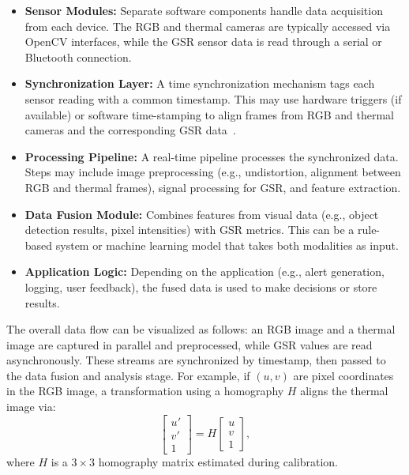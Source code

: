 \documentclass{article}
\begin{document}
    \begin{itemize}
        \item \textbf{Sensor Modules:} Separate software components handle data acquisition from each device. The RGB and thermal cameras are typically accessed via OpenCV interfaces, while the GSR sensor data is read through a serial or Bluetooth connection.
        \item \textbf{Synchronization Layer:} A time synchronization mechanism tags each sensor reading with a common timestamp. This may use hardware triggers (if available) or software time-stamping to align frames from RGB and thermal cameras and the corresponding GSR data~\cite{RefSync}.
        \item \textbf{Processing Pipeline:} A real-time pipeline processes the synchronized data. Steps may include image preprocessing (e.g., undistortion, alignment between RGB and thermal frames), signal processing for GSR, and feature extraction.
        \item \textbf{Data Fusion Module:} Combines features from visual data (e.g., object detection results, pixel intensities) with GSR metrics. This can be a rule-based system or machine learning model that takes both modalities as input.
        \item \textbf{Application Logic:} Depending on the application (e.g., alert generation, logging, user feedback), the fused data is used to make decisions or store results.
    \end{itemize}

    The overall data flow can be visualized as follows: an RGB image and a thermal image are captured in parallel and preprocessed, while GSR values are read asynchronously. These streams are synchronized by timestamp, then passed to the data fusion and analysis stage. For example, if $(u,v)$ are pixel coordinates in the RGB image, a transformation using a homography $H$ aligns the thermal image via:
    \[
        \begin{bmatrix}
            u' \\ v' \\ 1
        \end{bmatrix} = H \begin{bmatrix}
                              u \\ v \\ 1
        \end{bmatrix},
    \]
    where $H$ is a $3\times 3$ homography matrix estimated during calibration.
\end{document}
